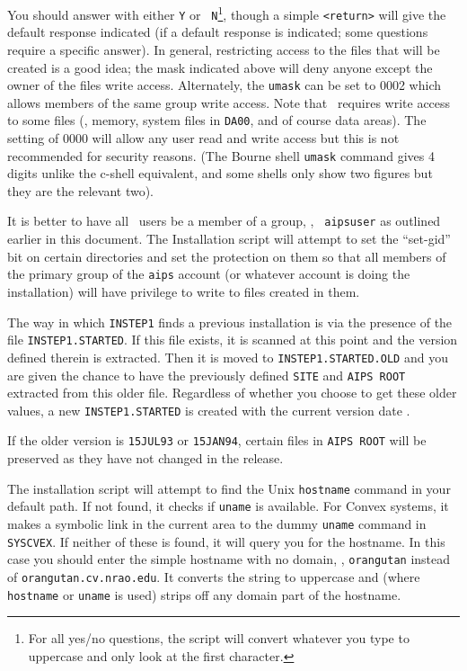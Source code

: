 \noindent You should answer with either {\tt Y} or {\tt
N}\footnote*{\eightpoint For all yes/no questions, the script will
   convert whatever you type to uppercase and only look at the first
   character.},
though a simple {\tt <return>} will give the default response indicated
(if a default response is indicated; some questions require a specific
answer).  In general, restricting access to the files that will be created
is a good idea; the mask indicated above will deny anyone except the owner
of the files write access.  Alternately, the {\tt umask} can be set to
0002 which allows members of the same group write access.  Note that
\AIPS\ requires write access to some files (\eg, memory, system files
in {\tt \dol DA00}, and of course data areas).  The setting of 0000 will
allow any user read and write access but this is not recommended for
security reasons.  (The Bourne shell {\tt umask} command gives 4
digits unlike the c-shell equivalent, and some shells only show two
figures but they are the relevant two).

It is better to have all \AIPS\ users be a member of a group, \eg, {\tt
aipsuser} as outlined earlier in this document.  The Installation script
will attempt to set the ``set-gid'' bit on certain directories and set
the protection on them so that all members of the primary group of the
{\tt aips} account (or whatever account is doing the installation) will
have privilege to write to files created in them.

\medskip{}

The way in which {\tt INSTEP1} finds a previous installation is via the
presence of the file {\tt INSTEP1.STARTED}.  If this file exists, it is
scanned at this point and the version defined therein is extracted.
Then it is moved to {\tt INSTEP1.STARTED.OLD} and you are given the
chance to have the previously defined {\tt SITE} and {\tt AIPS ROOT}
extracted from this older file.  Regardless of whether you choose to get
these older values, a new {\tt INSTEP1.STARTED} is created with the
current version date {\tt\thisver}.

If the older version is {\tt 15JUL93} or {\tt 15JAN94}, certain files in
{\tt AIPS ROOT} will be preserved as they have not changed in the
{\tt\thisver} release.


The installation script will attempt to find the Unix {\tt hostname}
command in your default path.  If not found, it checks if {\tt uname} is
available.  For Convex systems, it makes a symbolic link in the current
area to the dummy {\tt uname} command in {\tt\dol SYSCVEX}.  If neither of
these is found, it will query you for the hostname.  In this case you
should enter the simple hostname with no domain, \eg, {\tt orangutan}
instead of {\tt orangutan.cv.nrao.edu}.  It converts the string to
uppercase and (where {\tt hostname} or {\tt uname} is used) strips off
any domain part of the hostname.

